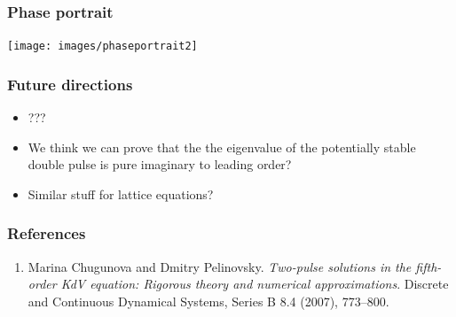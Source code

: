 \documentclass[16pt]{beamer}
\begin{document}
\begin{frame}
	\frametitle{Phase portrait}
	\fontsize{16}{7.2}\selectfont
	\begin{center}
	\texttt{[image: images/phaseportrait2]}
	\end{center}
\end{frame}

\begin{frame}
	\frametitle{Future directions}
	\fontsize{16}{7.2}\selectfont
	\begin{itemize}
		\item ???
		\item We think we can prove that the the eigenvalue of the potentially stable double pulse is pure imaginary to leading order?
		\item Similar stuff for lattice equations?
	\end{itemize}
\end{frame}

\begin{frame}
	\frametitle{References}
	\fontsize{14}{7.2}\selectfont
	\begin{enumerate}
	\item Marina Chugunova and Dmitry Pelinovsky. \emph{Two-pulse solutions in the fifth-order KdV equation: Rigorous theory and numerical approximations}. Discrete and Continuous Dynamical Systems, Series B 8.4 (2007), 773–800.
	\end{enumerate}
\end{frame}
 
\end{document}
